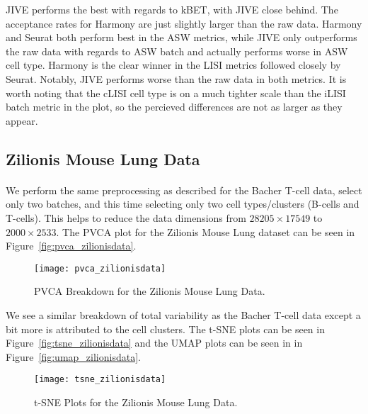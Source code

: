 \documentclass[
12pt, %
letterpaper, %
oneside, %
headinclude,footinclude, %
BCOR5mm, %
]{scrartcl}
\begin{document}
JIVE performs the best with regards to kBET, with JIVE close behind. The acceptance rates for Harmony are just slightly larger than the raw data. Harmony and Seurat both perform best in the ASW metrics, while JIVE only outperforms the raw data with regards to ASW batch and actually performs worse in ASW cell type. Harmony is the clear winner in the LISI metrics followed closely by Seurat. Notably, JIVE performs worse than the raw data in both metrics. It is worth noting that the cLISI cell type is on a much tighter scale than the iLISI batch metric in the plot, so the percieved differences are not as larger as they appear.


\subsection{Zilionis Mouse Lung Data}

\paragraph*{}
We perform the same preprocessing as described for the Bacher T-cell data, select only two batches, and this time selecting only two cell types/clusters (B-cells and T-cells). This helps to reduce the data dimensions from $28205 \times 17549$ to $2000 \times 2533$. The PVCA plot for the Zilionis Mouse Lung dataset can be seen in Figure~\vref{fig:pvca_zilionisdata}.

\begin{figure}[H]
    \centering 
    \texttt{[image: pvca\_zilionisdata]} 
    \caption[PVCA Breakdown for the Zilionis Mouse Lung Data]{PVCA Breakdown for the Zilionis Mouse Lung Data.}
    \label{fig:pvca_zilionisdata} 
\end{figure}

We see a similar breakdown of total variability as the Bacher T-cell data except a bit more is attributed to the cell clusters. The t-SNE plots can be seen in Figure~\vref{fig:tsne_zilionisdata} and the UMAP plots can be seen in in Figure~\vref{fig:umap_zilionisdata}.

\begin{figure}[H]
    \centering 
    \texttt{[image: tsne\_zilionisdata]} 
    \caption[t-SNE Plots for the Zilionis Mouse Lung Data]{t-SNE Plots for the Zilionis Mouse Lung Data.}
    \label{fig:tsne_zilionisdata}
\end{figure}
\end{document}
